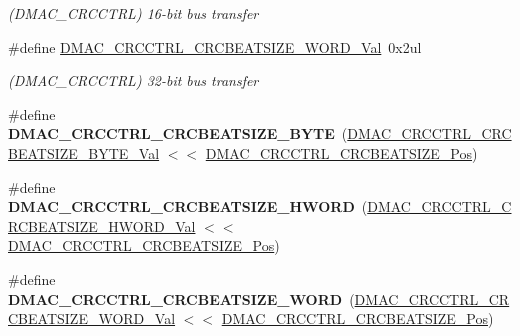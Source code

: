 \begin{DoxyCompactItemize}
\begin{DoxyCompactList}\small\item\em (D\+M\+A\+C\+\_\+\+C\+R\+C\+C\+T\+R\+L) 16-\/bit bus transfer \end{DoxyCompactList}\item 
\hypertarget{group___s_a_m_l21___d_m_a_c_gab318a37b490376a59e0d238d90403621}{}\#define \hyperlink{group___s_a_m_l21___d_m_a_c_gab318a37b490376a59e0d238d90403621}{D\+M\+A\+C\+\_\+\+C\+R\+C\+C\+T\+R\+L\+\_\+\+C\+R\+C\+B\+E\+A\+T\+S\+I\+Z\+E\+\_\+\+W\+O\+R\+D\+\_\+\+Val}~0x2ul\label{group___s_a_m_l21___d_m_a_c_gab318a37b490376a59e0d238d90403621}

\begin{DoxyCompactList}\small\item\em (D\+M\+A\+C\+\_\+\+C\+R\+C\+C\+T\+R\+L) 32-\/bit bus transfer \end{DoxyCompactList}\item 
\hypertarget{group___s_a_m_l21___d_m_a_c_gac787d84ad6d945207c6e6ce517ec1202}{}\#define {\bfseries D\+M\+A\+C\+\_\+\+C\+R\+C\+C\+T\+R\+L\+\_\+\+C\+R\+C\+B\+E\+A\+T\+S\+I\+Z\+E\+\_\+\+B\+Y\+T\+E}~(\hyperlink{group___s_a_m_l21___d_m_a_c_gafb441226141142da141437a86846bfc9}{D\+M\+A\+C\+\_\+\+C\+R\+C\+C\+T\+R\+L\+\_\+\+C\+R\+C\+B\+E\+A\+T\+S\+I\+Z\+E\+\_\+\+B\+Y\+T\+E\+\_\+\+Val} $<$$<$ \hyperlink{group___s_a_m_l21___d_m_a_c_ga363d4ea6d48fb9ce3a6c80e3be967852}{D\+M\+A\+C\+\_\+\+C\+R\+C\+C\+T\+R\+L\+\_\+\+C\+R\+C\+B\+E\+A\+T\+S\+I\+Z\+E\+\_\+\+Pos})\label{group___s_a_m_l21___d_m_a_c_gac787d84ad6d945207c6e6ce517ec1202}

\item 
\hypertarget{group___s_a_m_l21___d_m_a_c_gac14014cc4e44d5aa0026676b234c882c}{}\#define {\bfseries D\+M\+A\+C\+\_\+\+C\+R\+C\+C\+T\+R\+L\+\_\+\+C\+R\+C\+B\+E\+A\+T\+S\+I\+Z\+E\+\_\+\+H\+W\+O\+R\+D}~(\hyperlink{group___s_a_m_l21___d_m_a_c_gae74b5936060eee5d0a25c70cbc863990}{D\+M\+A\+C\+\_\+\+C\+R\+C\+C\+T\+R\+L\+\_\+\+C\+R\+C\+B\+E\+A\+T\+S\+I\+Z\+E\+\_\+\+H\+W\+O\+R\+D\+\_\+\+Val} $<$$<$ \hyperlink{group___s_a_m_l21___d_m_a_c_ga363d4ea6d48fb9ce3a6c80e3be967852}{D\+M\+A\+C\+\_\+\+C\+R\+C\+C\+T\+R\+L\+\_\+\+C\+R\+C\+B\+E\+A\+T\+S\+I\+Z\+E\+\_\+\+Pos})\label{group___s_a_m_l21___d_m_a_c_gac14014cc4e44d5aa0026676b234c882c}

\item 
\hypertarget{group___s_a_m_l21___d_m_a_c_ga0b5d85da5fbacaaa452e162b573bb3a6}{}\#define {\bfseries D\+M\+A\+C\+\_\+\+C\+R\+C\+C\+T\+R\+L\+\_\+\+C\+R\+C\+B\+E\+A\+T\+S\+I\+Z\+E\+\_\+\+W\+O\+R\+D}~(\hyperlink{group___s_a_m_l21___d_m_a_c_gab318a37b490376a59e0d238d90403621}{D\+M\+A\+C\+\_\+\+C\+R\+C\+C\+T\+R\+L\+\_\+\+C\+R\+C\+B\+E\+A\+T\+S\+I\+Z\+E\+\_\+\+W\+O\+R\+D\+\_\+\+Val} $<$$<$ \hyperlink{group___s_a_m_l21___d_m_a_c_ga363d4ea6d48fb9ce3a6c80e3be967852}{D\+M\+A\+C\+\_\+\+C\+R\+C\+C\+T\+R\+L\+\_\+\+C\+R\+C\+B\+E\+A\+T\+S\+I\+Z\+E\+\_\+\+Pos})\label{group___s_a_m_l21___d_m_a_c_ga0b5d85da5fbacaaa452e162b573bb3a6}


\end{DoxyCompactItemize}
